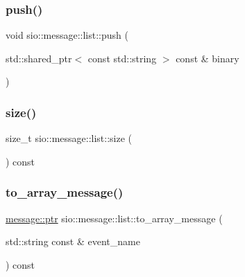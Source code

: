 \mbox{\label{classsio_1_1message_1_1list_abf0d78408f9563cdcef22820419dcf16}} 
\subsubsection{\texorpdfstring{push()}{push()}\hspace{0.1cm}{\footnotesize\ttfamily [5/5]}}
{\footnotesize\ttfamily void sio\+::message\+::list\+::push (\begin{DoxyParamCaption}\item[{std\+::shared\+\_\+ptr$<$ const std\+::string $>$ const \&}]{binary }\end{DoxyParamCaption})\hspace{0.3cm}{\ttfamily [inline]}}

\mbox{\label{classsio_1_1message_1_1list_ab6107e3ef270aa6824c34129e1767843}} 
\subsubsection{\texorpdfstring{size()}{size()}}
{\footnotesize\ttfamily size\+\_\+t sio\+::message\+::list\+::size (\begin{DoxyParamCaption}{ }\end{DoxyParamCaption}) const\hspace{0.3cm}{\ttfamily [inline]}}

\mbox{\label{classsio_1_1message_1_1list_a9d9bd1c52aaf57826a9732b2808ee38c}} 
\subsubsection{\texorpdfstring{to\+\_\+array\+\_\+message()}{to\_array\_message()}\hspace{0.1cm}{\footnotesize\ttfamily [1/2]}}
{\footnotesize\ttfamily \hyperlink{classsio_1_1message_a6340b6fef57e4516eb17928b1885a615}{message\+::ptr} sio\+::message\+::list\+::to\+\_\+array\+\_\+message (\begin{DoxyParamCaption}\item[{std\+::string const \&}]{event\+\_\+name }\end{DoxyParamCaption}) const\hspace{0.3cm}{\ttfamily [inline]}}


